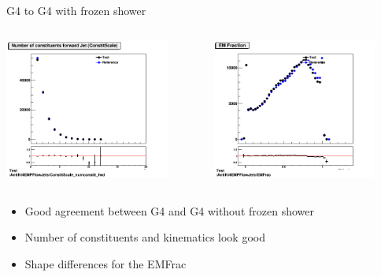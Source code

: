\begin{frame}{G4 to G4 with frozen shower}
    \begin{columns}
        \begin{column}{0.5\textwidth}
            \includegraphics[width=0.85\textwidth]{1r_numconstit_constit}
        \end{column}
        \begin{column}{0.5\textwidth}
            \includegraphics[width=0.85\textwidth]{1r_EMFrac}
        \end{column}
    \end{columns}
        \begin{itemize}
            \item Good agreement between G4 and G4 without frozen shower
            \item Number of constituents and kinematics look good
            \item Shape differences for the EMFrac
        \end{itemize}
\end{frame}

